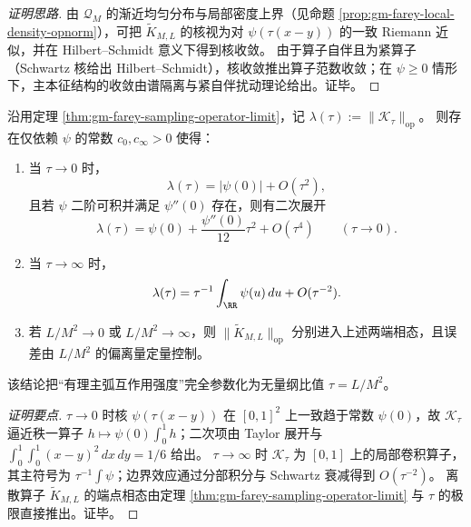 
\begin{proof}[证明思路]
由 \(\mathcal{Q}_M\) 的渐近均匀分布与局部密度上界（见命题 \ref{prop:gm-farey-local-density-opnorm}），可把 \(\widetilde K_{M,L}\) 的核视为对 \(\psi(\tau(x-y))\) 的一致 Riemann 近似，并在 Hilbert--Schmidt 意义下得到核收敛。
由于算子自伴且为紧算子（Schwartz 核给出 Hilbert--Schmidt），核收敛推出算子范数收敛；在 \(\psi\ge 0\) 情形下，主本征结构的收敛由谱隔离与紧自伴扰动理论给出。证毕。
\end{proof}

\begin{proposition}\label{prop:gm-farey-tau-spectral-phases}
沿用定理 \ref{thm:gm-farey-sampling-operator-limit}，记
\(
\lambda(\tau):=\|\mathcal{K}_\tau\|_{\mathrm{op}}
\)。
则存在仅依赖 \(\psi\) 的常数 \(c_0,c_\infty>0\) 使得：
\begin{enumerate}
  \item 当 \(\tau\to 0\) 时，
  \[
  \lambda(\tau)=|\psi(0)|+O(\tau^2),
  \]
  且若 \(\psi\) 二阶可积并满足 \(\psi''(0)\) 存在，则有二次展开
  \[
  \lambda(\tau)=\psi(0)+\frac{\psi''(0)}{12}\tau^2+O(\tau^4)
  \qquad(\tau\to 0).
  \]
  \item 当 \(\tau\to \infty\) 时，
  \[
  \lambda(\tau)=\tau^{-1}\int_{\RR}\psi(u)\,du+O(\tau^{-2}).
  \]
  \item 若 \(L/M^2\to 0\) 或 \(L/M^2\to\infty\)，则 \(\|\widetilde K_{M,L}\|_{\mathrm{op}}\) 分别进入上述两端相态，且误差由 \(L/M^2\) 的偏离量定量控制。
\end{enumerate}
该结论把“有理主弧互作用强度”完全参数化为无量纲比值 \(\tau=L/M^2\)。
\end{proposition}

\begin{proof}[证明要点]
\(\tau\to 0\) 时核 \(\psi(\tau(x-y))\) 在 \([0,1]^2\) 上一致趋于常数 \(\psi(0)\)，故 \(\mathcal{K}_\tau\) 逼近秩一算子 \(h\mapsto \psi(0)\int_0^1 h\)；二次项由 Taylor 展开与
\(
\int_0^1\!\int_0^1 (x-y)^2\,dx\,dy=1/6
\)
给出。
\(\tau\to\infty\) 时 \(\mathcal{K}_\tau\) 为 \([0,1]\) 上的局部卷积算子，其主符号为 \(\tau^{-1}\int\psi\)；边界效应通过分部积分与 Schwartz 衰减得到 \(O(\tau^{-2})\)。
离散算子 \(\widetilde K_{M,L}\) 的端点相态由定理 \ref{thm:gm-farey-sampling-operator-limit} 与 \(\tau\) 的极限直接推出。证毕。
\end{proof}

